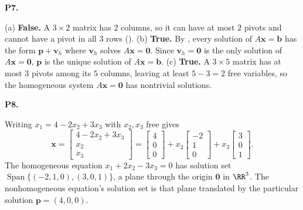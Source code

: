 \documentclass[10pt]{scrartcl}
\newcommand{\vv}[1]{\mathbf{#1}}
\DeclareMathOperator{\spn}{Span}
\begin{document}
\begin{prob}\textbf{P7.}
\begin{steps}
  \ii (a) \textbf{False.} A $3\times2$ matrix has $2$ columns, so it can have at most $2$ pivots and cannot have a pivot in all $3$ rows ().
  \ii (b) \textbf{True.} By , every solution of $A\vv x=\vv b$ has the form $\vv p+\vv v_h$ where $\vv v_h$ solves $A\vv x=\vv0$. Since $\vv v_h=\vv0$ is the only solution of $A\vv x=\vv0$, $\vv p$ is the unique solution of $A\vv x=\vv b$.
  \ii (c) \textbf{True.} A $3\times5$ matrix has at most $3$ pivots among its $5$ columns, leaving at least $5-3=2$ free variables, so the homogeneous system $A\vv x=\vv0$ has nontrivial solutions.
\end{steps}
\end{prob}

\begin{prob}\textbf{P8.}\par{}
Writing $x_1=4-2x_2+3x_3$ with $x_2,x_3$ free gives
\[
  \vv x = \begin{bmatrix}4-2x_2+3x_3\\x_2\\x_3\end{bmatrix} = \begin{bmatrix}4\\0\\0\end{bmatrix} + x_2\begin{bmatrix}-2\\1\\0\end{bmatrix} + x_3\begin{bmatrix}3\\0\\1\end{bmatrix}.
\]
The homogeneous equation $x_1+2x_2-3x_3=0$ has solution set $\spn\{(-2,1,0),(3,0,1)\}$, a plane through the origin $\vv0$ in $\RR^3$. The nonhomogeneous equation's solution set is that plane translated by the particular solution $\vv p=(4,0,0)$.
\end{prob}
\end{document}
